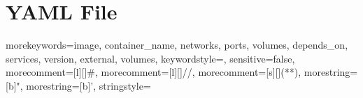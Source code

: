 \appendix
\chapter{YAML File}
\label{app:yamlfile}

    {morekeywords={image, container_name, networks, ports, volumes, depends_on, services, version, external, volumes},
    keywordstyle=\color{bluekeywords},
    sensitive=false,
    morecomment=[l][\color{greencomments}]{\#},
    morecomment=[l][\color{greencomments}]{//},
    morecomment=[s][\color{greencomments}]{{(*}{*)}},
    morestring=[b]",
    morestring=[b]',
    stringstyle=\color{redstrings}
    }

    {
      \lstset{
          language=YAML,
          basicstyle=\ttfamily,
          breaklines=true,
          columns=fullflexible}
    }
    {}


